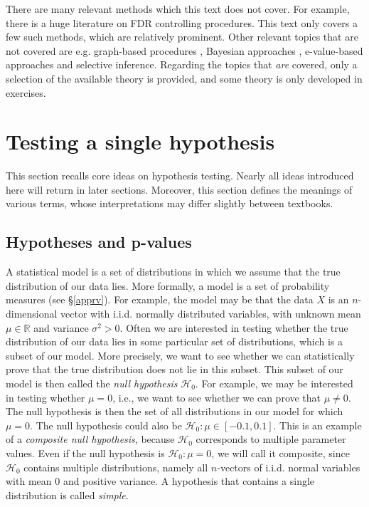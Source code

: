 \documentclass[11pt]{article}
\theoremstyle{plain}
\theoremstyle{definition}
\newcommand{\reals}{\mathbb{R}}
\newcommand{\Hy}{\mathcal{H}}
\newcommand{\citp}{\citep}
\begin{document}
There are many relevant methods which this text does not cover. For example, there is a huge literature on FDR controlling procedures. This text only covers a few such methods, which are relatively prominent. Other relevant topics that are not covered are e.g. graph-based procedures \citp{bogomolov2021hypotheses}, Bayesian approaches \citp{storey2002direct}, e-value-based approaches \citp{ramdas2025hypothesis} and selective inference. Regarding the topics that \emph{are} covered, only a selection of the available theory is provided, and some theory is only developed in exercises.



\newpage

\section{Testing a single hypothesis} \label{secsingle}
This section  recalls core ideas on hypothesis testing. Nearly all ideas introduced here will return in later sections.
Moreover, this section  defines the meanings of various terms, whose interpretations may differ slightly  between textbooks. 



\subsection{Hypotheses and p-values} 
A statistical model is a set of distributions in which we assume that the true distribution of our data lies. More formally, a model is a set of probability measures (see \S\ref{apprv}). For example, the model may be that the data $X$ is an $n$-dimensional vector with i.i.d. normally distributed variables,  with unknown mean $\mu\in \reals$ and variance $\sigma^2>0$. Often we are interested in testing whether the true distribution of our data lies in some particular set of distributions, which is a subset of our model. More precisely, we want to see whether we can statistically prove that the true distribution does not lie in this subset. This subset of our model is then called the \emph{null hypothesis} $\Hy_0$.
For example, we may be interested in testing whether $\mu=0$, i.e., we want to see whether we can prove that $\mu\neq0$. The null hypothesis is then the set of all distributions in our model for which $\mu=0$. The null hypothesis could also be $\Hy_0: \mu\in [-0.1,0.1]$. This is an example of a \emph{composite null hypothesis}, because $\Hy_0$ corresponds to multiple parameter values. Even if the null hypothesis is $\Hy_0: \mu=0$, we will call it composite, since $\Hy_0$ contains multiple distributions, namely all $n$-vectors of i.i.d. normal variables with mean 0 and positive variance. A hypothesis that contains a single distribution is called \emph{simple}. 
\end{document}
